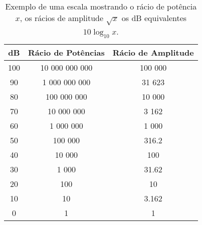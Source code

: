\begin{table}[hb]
    \centering
    \begin{tabular}{|c|c|c|}
         \hline
         dB & Rácio de Potências & Rácio de Amplitude \\
         \hline
         100 & 10 000 000 000 & 100 000 \\
         \hline
         90 & 1 000 000 000 & 31 623 \\
         \hline
         80 & 100 000 000 & 10 000 \\
         \hline
         70 & 10 000 000 & 3 162 \\
         \hline
         60 & 1 000 000 & 1 000 \\
         \hline
         50 & 100 000 & 316.2 \\
         \hline
         40 & 10 000 & 100 \\
         \hline
         30 & 1 000 & 31.62 \\
         \hline
         20 & 100 & 10 \\
         \hline
         10 & 10 & 3.162 \\
         \hline
         0 & 1 & 1 \\
         \hline
    \end{tabular}
    \caption{Exemplo de uma escala mostrando o rácio de potência $x$, os rácios de amplitude $\sqrt{x}$ os dB equivalentes $10 \log_{10} x$.}
    \label{tab:tabela_racio}
\end{table}